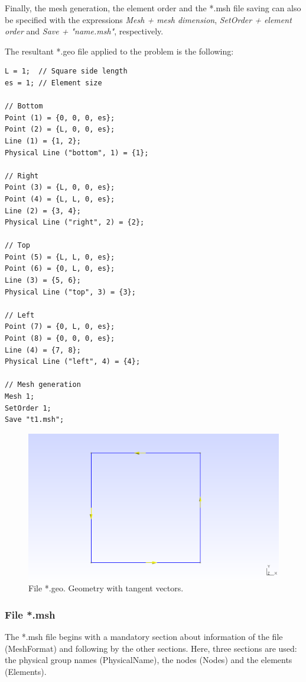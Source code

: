 \documentclass[A4]{article}
\begin{document}
Finally, the mesh generation, the element order and the *.msh file saving can also be specified with the expressions \textit{Mesh + mesh dimension}, \textit{SetOrder + element order} and \textit{Save + "name.msh"}, respectively.

The resultant *.geo file applied to the problem is the following:

\begin{Verbatim}
L = 1;  // Square side length
es = 1; // Element size

// Bottom
Point (1) = {0, 0, 0, es};
Point (2) = {L, 0, 0, es};
Line (1) = {1, 2};
Physical Line ("bottom", 1) = {1};

// Right
Point (3) = {L, 0, 0, es};
Point (4) = {L, L, 0, es};
Line (2) = {3, 4};
Physical Line ("right", 2) = {2};

// Top
Point (5) = {L, L, 0, es};
Point (6) = {0, L, 0, es};
Line (3) = {5, 6};
Physical Line ("top", 3) = {3};

// Left
Point (7) = {0, L, 0, es};
Point (8) = {0, 0, 0, es};
Line (4) = {7, 8};
Physical Line ("left", 4) = {4};

// Mesh generation
Mesh 1;
SetOrder 1;
Save "t1.msh";
\end{Verbatim}

\begin{figure}[h]
	\centering
	\includegraphics[scale = 0.5]{geometry2.png}
	\caption{File *.geo. Geometry with tangent vectors.}
	\label{fig:geometry}
\end{figure}

\subsubsection{File *.msh}

The *.msh file begins with a mandatory section about information of the file (MeshFormat) and following by the other sections. Here, three sections are used: the physical group names (PhysicalName), the nodes (Nodes) and the elements (Elements).
\end{document}
